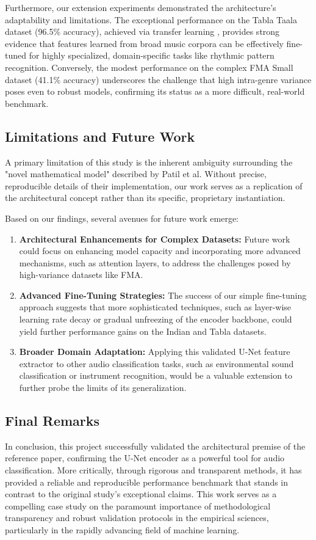 \documentclass[11pt,a4paper]{article}
\begin{document}
Furthermore, our extension experiments demonstrated the architecture's adaptability and limitations. The exceptional performance on the Tabla Taala dataset (96.5\% accuracy), achieved via transfer learning \textbf{\cite{choi2017transfer}}, %
provides strong evidence that features learned from broad music corpora can be effectively fine-tuned for highly specialized, domain-specific tasks like rhythmic pattern recognition. Conversely, the modest performance on the complex FMA Small dataset (41.1\% accuracy) \textbf{\cite{defferrard2017fma}} %
underscores the challenge that high intra-genre variance poses even to robust models, confirming its status as a more difficult, real-world benchmark.

\subsection{Limitations and Future Work}
A primary limitation of this study is the inherent ambiguity surrounding the "novel mathematical model" described by Patil et al. Without precise, reproducible details of their implementation, our work serves as a replication of the architectural concept rather than its specific, proprietary instantiation.

Based on our findings, several avenues for future work emerge:
\begin{enumerate}
    \item \textbf{Architectural Enhancements for Complex Datasets:} Future work could focus on enhancing model capacity and incorporating more advanced mechanisms, such as attention layers, to address the challenges posed by high-variance datasets like FMA.
    \item \textbf{Advanced Fine-Tuning Strategies:} The success of our simple fine-tuning approach suggests that more sophisticated techniques, such as layer-wise learning rate decay or gradual unfreezing of the encoder backbone, could yield further performance gains on the Indian and Tabla datasets.
    \item \textbf{Broader Domain Adaptation:} Applying this validated U-Net feature extractor to other audio classification tasks, such as environmental sound classification or instrument recognition, would be a valuable extension to further probe the limits of its generalization.
\end{enumerate}

\subsection{Final Remarks}
In conclusion, this project successfully validated the architectural premise of the reference paper, confirming the U-Net encoder as a powerful tool for audio classification. More critically, through rigorous and transparent methods, it has provided a reliable and reproducible performance benchmark that stands in contrast to the original study's exceptional claims. This work serves as a compelling case study on the paramount importance of methodological transparency and robust validation protocols in the empirical sciences, particularly in the rapidly advancing field of machine learning.
\end{document}
